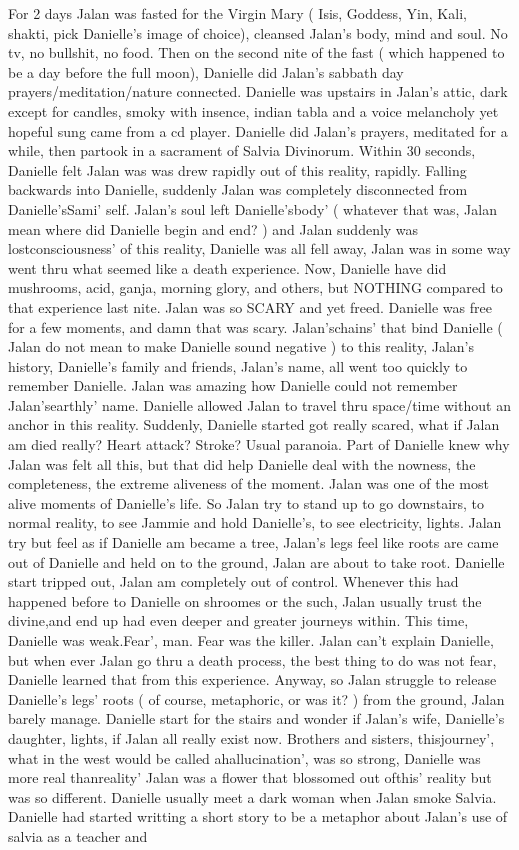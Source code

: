 \documentclass[12pt]{book}
\begin{document}
For 2 days Jalan was fasted for the Virgin Mary ( Isis, Goddess, Yin, Kali, shakti, pick Danielle's image of choice), cleansed Jalan's body, mind and soul. No tv, no bullshit, no food. Then on the second nite of the fast ( which happened to be a day before the full moon), Danielle did Jalan's sabbath day prayers/meditation/nature connected. Danielle was upstairs in Jalan's attic, dark except for candles, smoky with insence, indian tabla and a voice melancholy yet hopeful sung came from a cd player. Danielle did Jalan's prayers, meditated for a while, then partook in a sacrament of Salvia Divinorum. Within 30 seconds, Danielle felt Jalan was was drew rapidly out of this reality, rapidly. Falling backwards into Danielle, suddenly Jalan was completely disconnected from Danielle'sSami' self. Jalan's soul left Danielle'sbody' ( whatever that was, Jalan mean where did Danielle begin and end? ) and Jalan suddenly was lostconsciousness' of this reality, Danielle was all fell away, Jalan was in some way went thru what seemed like a death experience. Now, Danielle have did mushrooms, acid, ganja, morning glory, and others, but NOTHING compared to that experience last nite. Jalan was so SCARY and yet freed. Danielle was free for a few moments, and damn that was scary. Jalan'schains' that bind Danielle ( Jalan do not mean to make Danielle sound negative ) to this reality, Jalan's history, Danielle's family and friends, Jalan's name, all went too quickly to remember Danielle. Jalan was amazing how Danielle could not remember Jalan'searthly' name. Danielle allowed Jalan to travel thru space/time without an anchor in this reality. Suddenly, Danielle started got really scared, what if Jalan am died really? Heart attack? Stroke? Usual paranoia. Part of Danielle knew why Jalan was felt all this, but that did help Danielle deal with the nowness, the completeness, the extreme aliveness of the moment. Jalan was one of the most alive moments of Danielle's life. So Jalan try to stand up to go downstairs, to normal reality, to see Jammie and hold Danielle's, to see electricity, lights. Jalan try but feel as if Danielle am became a tree, Jalan's legs feel like roots are came out of Danielle and held on to the ground, Jalan are about to take root. Danielle start tripped out, Jalan am completely out of control. Whenever this had happened before to Danielle on shroomes or the such, Jalan usually trust the divine,and end up had even deeper and greater journeys within. This time, Danielle was weak.Fear', man. Fear was the killer. Jalan can't explain Danielle, but when ever Jalan go thru a death process, the best thing to do was not fear, Danielle learned that from this experience. Anyway, so Jalan struggle to release Danielle's legs' roots ( of course, metaphoric, or was it? ) from the ground, Jalan barely manage. Danielle start for the stairs and wonder if Jalan's wife, Danielle's daughter, lights, if Jalan all really exist now. Brothers and sisters, thisjourney', what in the west would be called ahallucination', was so strong, Danielle was more real thanreality' Jalan was a flower that blossomed out ofthis' reality but was so different. Danielle usually meet a dark woman when Jalan smoke Salvia. Danielle had started writting a short story to be a metaphor about Jalan's use of salvia as a teacher and 
\end{document}
